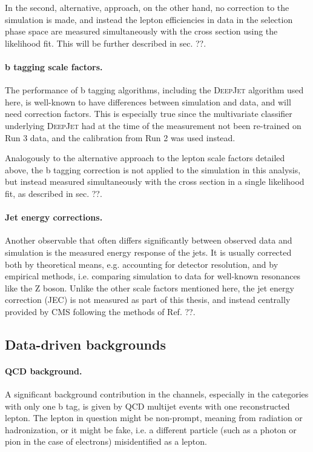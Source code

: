 In the second, alternative, approach, on the other hand, no correction to the simulation is made, and instead the lepton efficiencies in data in the selection phase space are measured simultaneously with the cross section using the likelihood fit. This will be further described in sec. ??.

\paragraph{b tagging scale factors.}

The performance of b tagging algorithms, including the \textsc{DeepJet} algorithm used here, is well-known to have differences between simulation and data, and will need correction factors. This is especially true since the multivariate classifier underlying \textsc{DeepJet} had at the time of the measurement not been re-trained on Run 3 data, and the calibration from Run 2 was used instead.

Analogously to the alternative approach to the lepton scale factors detailed above, the b tagging correction is not applied to the simulation in this analysis, but instead measured simultaneously with the \ttbar cross section in a single likelihood fit, as described in sec. ??.

\paragraph{Jet energy corrections.}

Another observable that often differs significantly between observed data and simulation is the measured energy response of the jets. It is usually corrected both by theoretical means, e.g. accounting for detector resolution, and by empirical methods, i.e. comparing simulation to data for well-known resonances like the Z boson. Unlike the other scale factors mentioned here, the jet energy correction (JEC) is not measured as part of this thesis, and instead centrally provided by CMS following the methods of Ref. ??. 

\subsection{Data-driven backgrounds}

\paragraph{QCD background.}

A significant background contribution in the \ljets channels, especially in the categories with only one b tag, is given by QCD multijet events with one reconstructed lepton. The lepton in question might be non-prompt, meaning from radiation or hadronization, or it might be fake, i.e. a different particle (such as a photon or pion in the case of electrons) misidentified as a lepton. 

